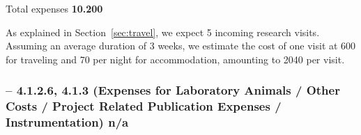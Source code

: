 Total expenses \textbf{10.200 \texteuro}
\medskip

As explained in Section~\ref{sec:travel}, we expect 5 incoming research visits.  Assuming
an average duration of 3 weeks, we estimate the cost of one visit at 600 {\texteuro} for
traveling and 70 {\texteuro} per night for accommodation, amounting to 2040 \texteuro per
visit.

\subsubsection*{-- 4.1.2.6, 4.1.3 (Expenses for Laboratory Animals / Other Costs
/ Project Related Publication Expenses / Instrumentation) \sf\qquad n/a}



